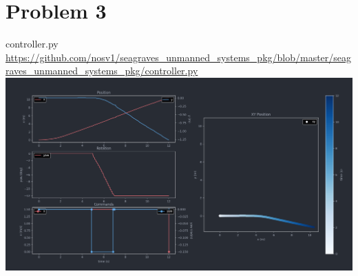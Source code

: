 \documentclass{article}
\begin{document}
    \section*{Problem 3}
        \raggedright
        controller.py \break
        \url{https://github.com/nosv1/seagraves_unmanned_systems_pkg/blob/master/seagraves_unmanned_systems_pkg/controller.py} \break
        \includegraphics[width=\linewidth]{Problem 3 Telemetry.png}
    
\end{document}
